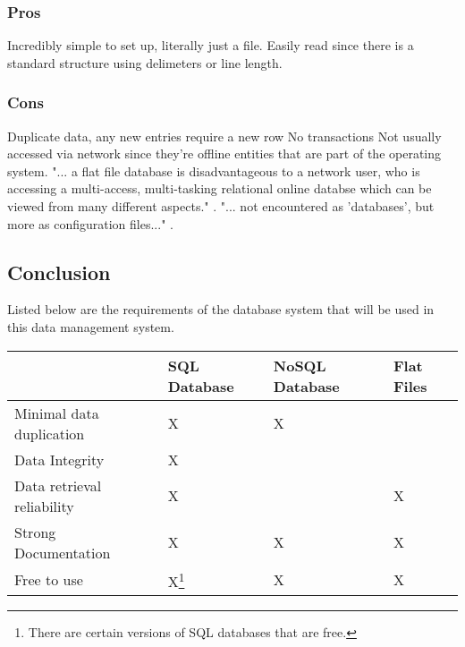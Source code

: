 \documentclass[draftclsnofoot,onecolumn,letterpaper,10pt,compsoc]{IEEEtran}
\begin{document}
        \subsubsection{Pros}
            Incredibly simple to set up, literally just a file.
            Easily read since there is a standard structure using delimeters or line length.
    
        \subsubsection{Cons}
            Duplicate data, any new entries require a new row
            No transactions
            Not usually accessed via network since they're offline entities that are part of the operating system\cite{Techwalla}.
            "... a flat file database is disadvantageous to a network user, who is accessing a multi-access, multi-tasking relational online databse which can be viewed from many different aspects." \cite{Techwalla}.
            "... not encountered as 'databases', but more as configuration files..." \cite{Techwalla}.
    
    \subsection{Conclusion}
        Listed below are the requirements of the database system that will be used in this data management system.
        
        \begin{center}
            \begin{tabular}{| m{15em} | m{10em} | m{10em} | m{10em} |}
                \hline
                    & SQL Database & NoSQL Database & Flat Files \\
                
                \hline
                    Minimal data duplication & X & X & \\
                    
                \hline
                    Data Integrity & X &  &  \\
                
                \hline
                    Data retrieval reliability & X &  & X \\
                    
                \hline
                    Strong Documentation & X & X & X \\
                    
                \hline
                    Free to use & X\footnote{There are certain versions of SQL databases that are free.} & X & X \\
                    
                \hline
            \end{tabular}
        \end{center}
        
\end{document}
